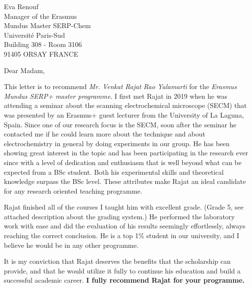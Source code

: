 \documentclass[11pt, a4paper]{letter} %
\begin{document}

\begin{letter}{

Eva Renouf \\
Manager of the Erasmus \\ \hspace{0.1 cm} Mundus Master SERP-Chem \\
Université Paris-Sud \\
Building 308 - Room 3106 \\
91405 ORSAY FRANCE \\
}





\opening{Dear Madam,}

This letter is to recommend \emph{Mr. Venkat Rajat Rao Yalamarti} for the \emph{Erasmus Mundus SERP+ master programme}. I first met Rajat in 2019 when he was attending a seminar about the scanning electrochemical microscope (SECM) that was presented by an Erasmus+ guest lecturer from the University of La Laguna, Spain. Since one of our research focus is the SECM, soon after the seminar he contacted me if he could learn more about the technique and about electrochemistry in general by doing experiments in our group. He has been showing great interest in the topic and has been participating in the research ever since with a level of dedication and enthusiasm that is well beyond what can be expected from a BSc student. Both his experimental skills and theoretical knowledge surpass the BSc level. These attributes make Rajat an ideal candidate for any research oriented teaching programme.

Rajat finished all of the courses I taught him with excellent grade. (Grade 5, see attached description about the grading system.) He performed the laboratory work with ease and did the evaluation of his results seemingly effortlessly, always reaching the correct conclusion. He is a top 1\% student in our university, and I believe he would be in any other programme.

It is my conviction that Rajat deserves the benefits that the scholarship can provide, and that he would utilize it fully to continue his education and build a successful academic career. \textbf{I fully recommend Rajat for your programme.}


\end{letter}
\end{document}
